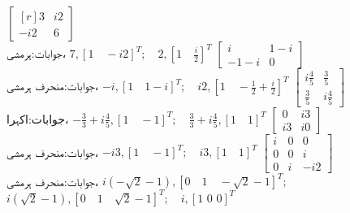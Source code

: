  \quad
$\begin{bmatrix*}[r]3&i2\\-i2&6  \end{bmatrix*}$\\
جوابات:ہرمشی، 
$7,[1\quad -i2 ]^T;\quad 2, [1\quad \tfrac{i}{2}]^T$
\quad
$\begin{bmatrix}i&1-i\\-1-i&0  \end{bmatrix}$\\
جوابات:منحرف ہرمشی، 
$-i,[1\quad 1-i  ]^T;\quad i2, [ 1\quad-\tfrac{1}{2}+\tfrac{i}{2}]^T$
\quad
$\begin{bmatrix}i\tfrac{4}{5}&\tfrac{3}{5}\\[0.25em]\tfrac{3}{5}&i\tfrac{4}{5}  \end{bmatrix}$\\
جوابات:اکہرا، 
$-\tfrac{3}{3}+i\tfrac{4}{5},[1\quad -1  ]^T;\quad \tfrac{3}{3}+i\tfrac{4}{5}, [ 1\quad 1]^T$
\quad
$\begin{bmatrix}0&i3\\ i3&i0 \end{bmatrix}$\\
جوابات:منحرف ہرمشی، 
$-i3,[1\quad -1  ]^T;\quad i3, [ 1\quad 1]^T$
\quad
$\begin{bmatrix}i&0&0\\0&0&i\\0&i&-i2 \end{bmatrix}$\\
جوابات:منحرف ہرمشی، 
$i(-\sqrt{2}-1),[0\quad 1\quad -\sqrt{2}-1  ]^T;$\\
$i(\sqrt{2}-1),[0\quad 1\quad \sqrt{2}-1  ]^T;\quad i,[1\,\,0\,\,0]^T$

